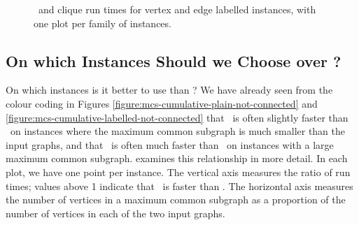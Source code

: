 \begin{figure}[htb]
{        \label{figure:mcs33ved-runtime-mcsplitdown-clique-bv}
    }
    \caption{\McSplitDown\ and clique run times for vertex and edge labelled instances, with one plot per family of instances.}
    \label{figure:mcs33ved-runtime-mcsplitdown-clique-scatters}
\end{figure}


\FloatBarrier


\subsection{On which Instances Should we Choose \McSplit{$\downarrow$}
    over \McSplit?}\label{sec:which-mcsplit-down}

On which instances is it better to use \McSplit{$\downarrow$} than \McSplit?
We have already seen from the colour coding in Figures
\ref{figure:mcs-cumulative-plain-not-connected} and
\ref{figure:mcs-cumulative-labelled-not-connected}
that \McSplit\ is often slightly faster than \McSplitDown\ on instances where
the maximum common subgraph is much smaller than the input graphs, and that
\McSplitDown\ is often much faster than \McSplit\ on instances with a large
maximum common subgraph.  
examines this relationship in more detail.  In each plot, we have one
point per instance.  The vertical axis measures the ratio of run times;
values above 1 indicate that \McSplitDown\ is faster than \McSplit.
The horizontal axis measures the number of vertices in a maximum
common subgraph as a proportion of the number of vertices in each
of the two input graphs.

